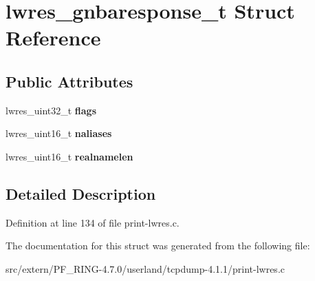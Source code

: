 \hypertarget{structlwres__gnbaresponse__t}{
\section{lwres\_\-gnbaresponse\_\-t Struct Reference}
\label{structlwres__gnbaresponse__t}
}
\subsection*{Public Attributes}
\begin{DoxyCompactItemize}
\item 
\hypertarget{structlwres__gnbaresponse__t_a790b991916a77f46ebd092aa0392263b}{
lwres\_\-uint32\_\-t {\bfseries flags}}
\label{structlwres__gnbaresponse__t_a790b991916a77f46ebd092aa0392263b}

\item 
\hypertarget{structlwres__gnbaresponse__t_a5e4a4c766de88badb952f1109514aa88}{
lwres\_\-uint16\_\-t {\bfseries naliases}}
\label{structlwres__gnbaresponse__t_a5e4a4c766de88badb952f1109514aa88}

\item 
\hypertarget{structlwres__gnbaresponse__t_ac968dabcbdbf01ec72049458b2854c0c}{
lwres\_\-uint16\_\-t {\bfseries realnamelen}}
\label{structlwres__gnbaresponse__t_ac968dabcbdbf01ec72049458b2854c0c}

\end{DoxyCompactItemize}


\subsection{Detailed Description}


Definition at line 134 of file print-\/lwres.c.



The documentation for this struct was generated from the following file:\begin{DoxyCompactItemize}
\item 
src/extern/PF\_\-RING-\/4.7.0/userland/tcpdump-\/4.1.1/print-\/lwres.c\end{DoxyCompactItemize}
